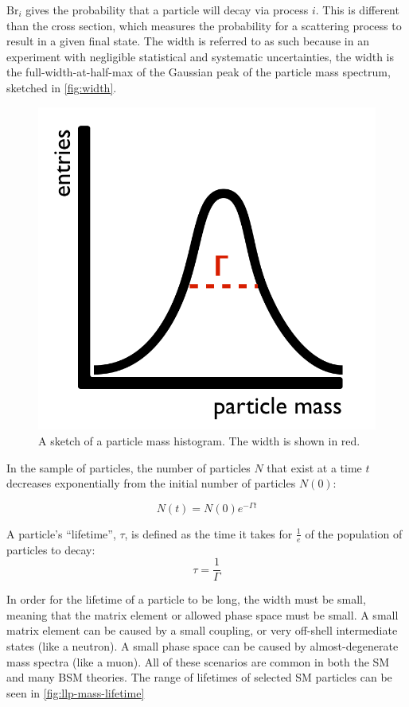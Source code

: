$\text{Br}_{i}$ gives the probability that a particle will decay via process $i$. This is different than the cross section, which measures the probability for a scattering process to result in a given final state. The width is referred to as such because in an experiment with negligible statistical and systematic uncertainties, the width is the full-width-at-half-max of the Gaussian peak of the particle mass spectrum, sketched in \autoref{fig:width}. 

\begin{figure}[!h]
\centering
\includegraphics[width=.3\textwidth]{figures/theory/particle-width.png}
\caption{A sketch of a particle mass histogram. The width is shown in red.}
\label{fig:width}
\end{figure}

In the sample of particles, the number of particles $N$ that exist at a time $t$ decreases exponentially from the initial number of particles $N(0)$:

\begin{equation}
N(t) = N(0) e^{-\Gamma t}
\end{equation}

A particle's ``lifetime'', $\tau$, is defined as the time it takes for $\frac{1}{e}$ of the population of particles to decay:
\begin{equation}
\tau = \frac{1}{\Gamma}
\end{equation}
 
In order for the lifetime of a particle to be long, the width must be small, meaning that the matrix element or allowed phase space must be small. A small matrix element can be caused by a small coupling, or very off-shell intermediate states (like a neutron). A small phase space can be caused by almost-degenerate mass spectra (like a muon). All of these scenarios are common in both the \ac{SM} and many \ac{BSM} theories. The range of lifetimes of selected \ac{SM} particles can be seen in \autoref{fig:llp-mass-lifetime} \cite{llp-whitepaper}


